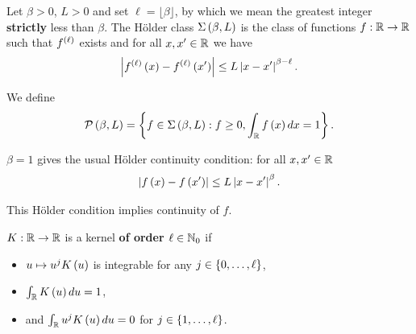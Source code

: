 \begin{definition}
  Let $\beta>0$, $L>0$ and set $\ell = \lfloor \beta\rfloor$, by which we mean the greatest integer \textbf{strictly} less than $\beta$. The Hölder class $\Sigma \left(\beta,L\right)$ is the class of functions $f:\mathbb{R}\rightarrow \mathbb{R}$ such that $f^{\left(\ell\right)}$ exists and for all $x,x'\in \mathbb{R}$ we have
  \begin{equation*}
    \left| f^{\left(\ell\right)}\left(x\right)- f^{\left(\ell\right)}\left(x'\right)\right|\leq L\left| x-x'\right|^{\beta -\ell}.
  \end{equation*}
\end{definition}

\begin{definition}
  We define
  \begin{equation*}
    \mathcal{P}\left(\beta,L\right) = \left\{f\in\Sigma\left(\beta,L\right): f\geq 0, \int_{\mathbb{R}} f\left(x\right)dx =1\right\}.
  \end{equation*}
\end{definition}
\begin{example}
  $\beta =1$ gives the usual Hölder continuity condition: for all $x,x'\in \mathbb{R}$
  \begin{equation*}
    \left| f\left(x\right)-f\left(x'\right)\right|\leq L\left| x-x'\right|^{\beta}.
  \end{equation*}
\end{example}
{\color{blue}
\begin{remark}
  This Hölder condition implies continuity of $f$.
\end{remark}}
\begin{definition}
  $K:\mathbb{R}\rightarrow \mathbb{R}$ is a kernel \textbf{of order $\ell \in \mathbb{N}_0$} if
  \begin{itemize}
    \item $u\mapsto u^j K\left(u\right)$ is integrable for any $j\in\left\{0,\ldots,\ell\right\}$,
    \item $\int_{\mathbb{R}} K\left(u\right) du =1$,
    \item and $\int_{\mathbb{R}} u^j K\left(u\right) du =0$ for $j\in\left\{1,\ldots, \ell\right\}$.
  \end{itemize}
\end{definition}

